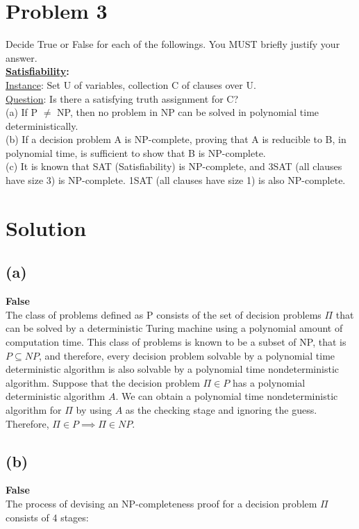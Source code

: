 \vspace{1cm}
\section*{Problem 3}
	Decide True or False for each of the followings. You MUST briefly justify your answer.\\
	
	\noindent
	\textbf{\underline{Satisfiability}:}\\
	\underline{Instance}: Set U of variables, collection C of clauses over U.\\
	\underline{Question}: Is there a satisfying truth assignment for C?\\
	
	\noindent
	(a) If P $\neq$ NP, then no problem in NP can be solved in polynomial time deterministically.\\
	(b) If a decision problem A is NP-complete, proving that A is reducible to B, in polynomial time, is sufficient to show that B is NP-complete.\\
	(c) It is known that SAT (Satisfiability) is NP-complete, and 3SAT (all clauses have size 3) is NP-complete. 1SAT (all clauses have size 1) is also NP-complete.
	
\section*{Solution}
	\subsection*{(a)}
		\textbf{False}\\
		The class of problems defined as P consists of the set of decision problems $\Pi$ that can be solved by a deterministic Turing machine using a polynomial amount of computation time. 
		This class of problems is known to be a subset of NP, that is $P\subseteq NP$, and therefore, every decision problem solvable by a polynomial time deterministic algorithm is also solvable by a  polynomial time nondeterministic algorithm. 
		Suppose that the decision problem $\Pi \in P$ has a polynomial deterministic algorithm $A$. 
		We can obtain a polynomial time nondeterministic algorithm for $\Pi$ by using $A$ as the checking stage and ignoring the guess. Therefore, $\Pi \in P \implies \Pi \in NP$.
	
	\newpage
	\subsection*{(b)}
		\textbf{False}\\
		The process of devising an NP-completeness proof for a decision problem $\Pi$ consists of 4 stages:\\
		
